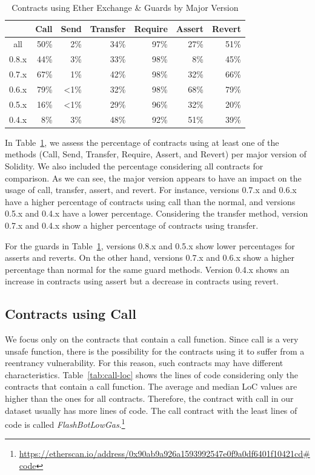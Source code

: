 \documentclass[10pt,conference]{IEEEtran}
\begin{document}
\begin{table}
\center
  \caption{Contracts using Ether Exchange \& Guards by Major Version}
  \label{tab:results-version}
  \begin{tabular}{crrrrrr}
    \hline
      & Call & Send & Transfer & Require & Assert & Revert \\
    \hline
    all & 50\% & 2\% & 34\% &  97\% & 27\% & 51\% \\
    0.8.x & 44\% & 3\% & 33\%  & 98\% & 8\% & 45\% \\
    0.7.x & 67\% & 1\% & 42\% & 98\% & 32\% & 66\% \\ 
    0.6.x & 79\% & <1\% & 32\% & 98\% & 68\% & 79\% \\
    0.5.x & 16\% & <1\% & 29\% & 96\% & 32\% & 20\% \\
    0.4.x & 8\% & 3\%  & 48\% & 92\% & 51\% & 39\% \\
    \hline
\end{tabular}
\end{table}

In Table~\ref{tab:results-version}, we assess the percentage of contracts using at least one of the methods (Call, Send, Transfer, Require, Assert, and Revert) per major version of Solidity. We also included the percentage considering all contracts for comparison.  As we can see, the major version appears to have an impact on the usage of call, transfer, assert, and revert. For instance, versions 0.7.x and 0.6.x have a higher percentage of contracts using call than the normal, and versions 0.5.x and 0.4.x have a lower percentage.  Considering the transfer method,  version 0.7.x and 0.4.x show a higher percentage of contracts using transfer.  

For the guards in Table~\ref{tab:results-version},  versions 0.8.x and 0.5.x show lower percentages for asserts and reverts.  On the other hand, versions 0.7.x and 0.6.x show a higher percentage than normal for the same guard methods. Version 0.4.x shows an increase in contracts using assert but a decrease in contracts using revert. 


\subsection{Contracts using Call}

We focus only on the contracts that contain a call function. Since call is a very unsafe function, there is the possibility for the contracts using it to suffer from a reentrancy vulnerability. For this reason, such contracts may have different characteristics. Table~\ref{tab:call-loc} shows the lines of code considering only the contracts that contain a call function. The average and median LoC values are higher than the ones for all contracts. Therefore, the contract with call in our dataset usually has more lines of code. The call contract with the least lines of code is called \textit{FlashBotLowGas}.\footnote{\url{https://etherscan.io/address/0x90ab9a926a1593992547e0f9a0df6401f10421cd\#code}}
\end{document}
